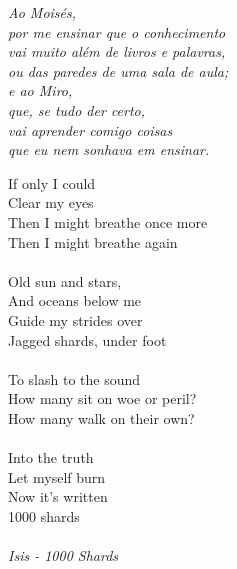 \documentclass[12pt,twoside]{report}
\begin{document}
\newpage

\vspace*{0.7\textheight}
\begin{flushright}
  \emph{
    Ao Moisés, \\ 
    por me ensinar que o conhecimento \\ 
    vai muito além de livros e palavras, \\
    ou das paredes de uma sala de aula; \\
    \vspace{0.5 cm}
    e ao Miro, \\
    que, se tudo der certo, \\ 
    vai aprender comigo coisas \\
    que eu nem sonhava em ensinar.
}
\end{flushright}

\newpage

\vspace*{0.2\textheight}
{\noindent 
If only I could \\
Clear my eyes \\
Then I might breathe once more \\
Then I might breathe again \\
\vspace{0.2 cm} \\
Old sun and stars, \\
And oceans below me \\
Guide my strides over \\
Jagged shards, under foot \\
\vspace{0.2 cm} \\
To slash to the sound \\
How many sit on woe or peril? \\
How many walk on their own? \\
\vspace{0.2 cm} \\
Into the truth \\
Let myself burn \\
Now it's written \\
1000 shards \\
\vspace{0.2 cm} \\
\emph {Isis - 1000 Shards}
}
\end{document}
